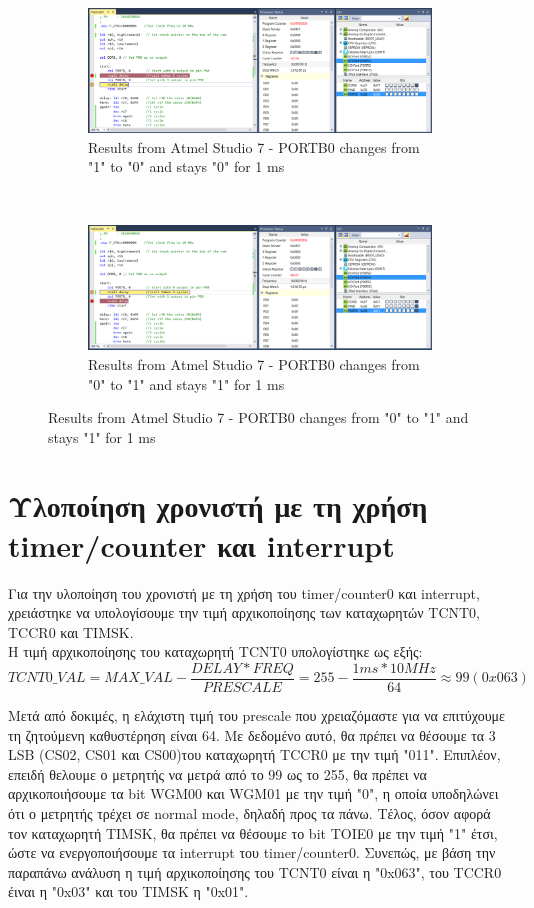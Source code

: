 \documentclass{article}
\begin{document}
\begin{figure}[h!]
		\begin{subfigure}[t]{0.5\textwidth}
			\centering
			\includegraphics[width=\linewidth]{./results/lab1a_atmel_result_c.png}
			\caption{Results from Αtmel Studio 7 - PORTB0 changes from "1" to "0" and stays "0" for 1 ms}
		\end{subfigure}%
		~
		\begin{subfigure}[t]{0.5\textwidth}
			\centering
			\includegraphics[width=\linewidth]{./results/lab1a_atmel_result_d.png}
			\caption{Results from Αtmel Studio 7 - PORTB0 changes from "0" to "1" and stays "1" for 1 ms}
		\end{subfigure}
	\end{figure}

\pagebreak
\section*{Υλοποίηση χρονιστή με τη χρήση timer/counter και interrupt}
Για την υλοποίηση του χρονιστή με τη χρήση του timer/counter0 και interrupt, χρειάστηκε να υπολογίσουμε την τιμή αρχικοποίησης των καταχωρητών TCNT0, TCCR0 και TIMSK.\\
Η τιμή αρχικοποίησης του καταχωρητή TCNT0 υπολογίστηκε ως εξής:
$$TCNT0\_VAL = MAX\_VAL - \frac{DELAY*FREQ}{PRESCALE} = 255 - \frac{1 ms * 10 MHz}{64} \approx 99 (0x063) $$

\noindent
Mετά από δοκιμές, η ελάχιστη τιμή του prescale που χρειαζόμαστε για να επιτύχουμε τη ζητούμενη καθυστέρηση είναι 64. Mε δεδομένο αυτό, θα πρέπει να θέσουμε τα 3 LSB (CS02, CS01 και CS00)του καταχωρητή TCCR0 με την τιμή "011". Επιπλέον, επειδή θελουμε ο μετρητής να μετρά από το 99 ως το 255, θα πρέπει να αρχικοποιήσουμε τα bit WGM00 και WGM01 με την τιμή "0", η οποία υποδηλώνει ότι ο μετρητής τρέχει σε normal mode, δηλαδή προς τα πάνω. Τέλος, όσον αφορά τον καταχωρητή TIMSK, θα πρέπει να θέσουμε το bit TOIE0 με την τιμή "1" έτσι, ώστε να ενεργοποιήσουμε τα interrupt του timer/counter0. Συνεπώς, με βάση την παραπάνω ανάλυση η τιμή αρχικοποίησης του TCNT0 είναι η "0x063", του TCCR0 έιναι η "0x03" και του TIMSK η "0x01".\\
\end{document}
